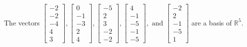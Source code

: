 \begin{exercise}
\begin{exerciseStatement}
  \end{exerciseStatement}
  \begin{exerciseAnswer}
   The vectors \(\left[\begin{array}{r}
-2 \\
-2 \\
-4 \\
4 \\
3
\end{array}\right] , \left[\begin{array}{r}
0 \\
-1 \\
-3 \\
2 \\
4
\end{array}\right] , \left[\begin{array}{r}
-5 \\
2 \\
3 \\
-2 \\
-2
\end{array}\right] , \left[\begin{array}{r}
4 \\
-1 \\
-5 \\
-1 \\
-5
\end{array}\right] , \text{ and } \left[\begin{array}{r}
-2 \\
2 \\
-1 \\
-5 \\
1
\end{array}\right]\) 
  	 are  a basis of \(\mathbb{R}^5\).
  


  \end{exerciseAnswer}
\end{exercise}